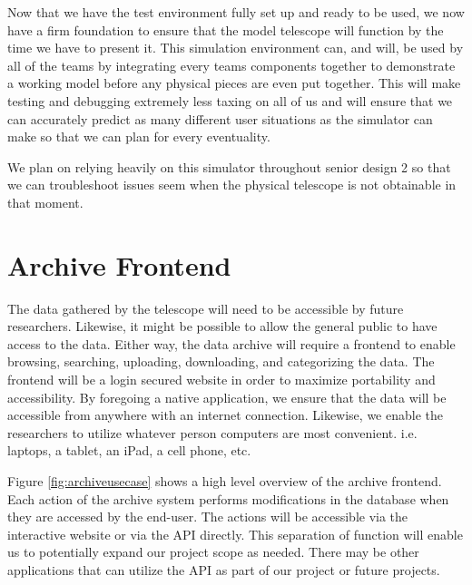 \documentclass[12pt]{report}
\begin{document}
Now that we have the test environment fully set up and ready to be used, we now have a firm foundation to ensure that the model telescope will function by the time we have to present it. This simulation environment can, and will, be used by all of the teams by integrating every teams components together to demonstrate a working model before any physical pieces are even put together. This will make testing and debugging extremely less taxing on all of us and will ensure that we can accurately predict as many different user situations as the simulator can make so that we can plan for every eventuality.

We plan on relying heavily on this simulator throughout senior design 2 so that we can troubleshoot issues seem when the physical telescope is not obtainable in that moment.

\section*{Archive Frontend}

The data gathered by the telescope will need to be accessible by future researchers. Likewise, it might be possible to allow the general public to have access to the data. Either way, the data archive will require a frontend to enable browsing, searching, uploading, downloading, and categorizing the data. The frontend will be a login secured website in order to maximize portability and accessibility. By foregoing a native application, we ensure that the data will be accessible from anywhere with an internet connection. Likewise, we enable the researchers to utilize whatever person computers are most convenient. i.e. laptops, a tablet, an iPad, a cell phone, etc.

Figure \ref{fig:archiveusecase} shows a high level overview of the archive frontend. Each action of the archive system performs modifications in the database when they are accessed by the end-user. The actions will be accessible via the interactive website or via the API directly. This separation of function will enable us to potentially expand our project scope as needed. There may be other applications that can utilize the API as part of our project or future projects.
\end{document}
